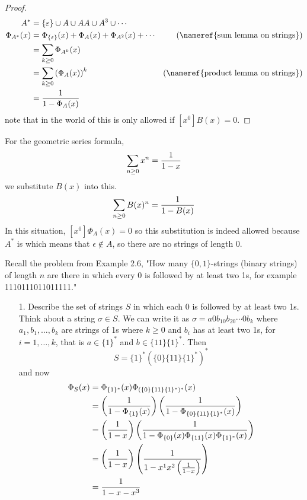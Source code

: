 \documentclass[english, 11pt]{article}
\begin{document}
     \begin{proof}
       \begin{align*}
         A^* & = \{\varepsilon\} \cup A \cup AA \cup A^3 \cup \cdots \\
         \Phi_{A^*}(x) & = \Phi_{\{\varepsilon\}}(x) + \Phi_{A}(x) + \Phi_{A^2}(x) + \cdots & \mbox{(\nameref{sum lemma on strings})}\\
         & = \sum_{k \geq 0} \Phi_{A^k}(x) \\
         & = \sum_{k \geq 0} \left( \Phi_A(x) \right)^k & \mbox{(\nameref{product lemma on strings})} \\
         & = \f{1}{1-\Phi_A(x)}
       \end{align*}
       note that in the world of  this is only allowed if $[x^0]B(x) = 0$.
     \end{proof}

     \begin{rem}
       For the geometric series formula,
       \[ \sum_{n \geq 0} x^n = \frac{1}{1-x} \]
       we substitute $B(x)$ into this.
       \[ \sum_{n \geq 0} B(x)^n = \frac{1}{1-B(x)} \]
       In this situation, $[x^0]\Phi_A(x) = 0$ so this substitution is indeed allowed because $A^*$ is  which means that $\epsilon \not \in A$, so there are no strings of length 0.
     \end{rem}

     \newpage

     Recall the problem from Example 2.6, "How many $\{0,1\}$-strings (binary strings) of length $n$ are there in which every 0 is followed by at least two 1s, for example 1110111011011111." \\

     \begin{itemize}
       \item[1.] Describe the set of strings $S$ in which each 0 is followed by at least two 1s. \\
       Think about a string $\sigma \in S$. We can write it as $\sigma = a0b_10b_20\cdots0b_k$ where $a_1, b_1, \ldots, b_k$ are strings of 1s where $k \geq 0$ and $b_i$ has at least two 1s, for $i = 1,\ldots,k$, that is $a \in \{1\}^*$ and $b \in \{11\}\{1\}^*$. Then
       \[ S=\{1\}^* \left( \{0\}\{11\}\{1\}^* \right)^* \]
       and now
       \begin{align*}
         \Phi_S(x) & = \Phi_{\{1\}^*}(x)\Phi_{(\{0\}\{11\}\{1\}^*)^*}(x) \\
         & = \left(\frac{1}{1-\Phi_{\{1\}}(x)}\right) \left( \frac{1}{1-\Phi_{\{0\}\{11\}\{1\}^*}(x)} \right) \\
         & = \left(\frac{1}{1-x}\right) \left(\frac{1}{1-\Phi_{\{0\}}(x)\Phi_{\{11\}}(x)\Phi_{\{1\}^*}(x)} \right)\\
         & = \left( \frac{1}{1-x} \right)\left( \frac{1}{1-x^1x^2 \left( \frac{1}{1-x} \right)} \right) \\
         & = \frac{1}{1-x-x^3}
       \end{align*}
     \end{itemize}
\end{document}
